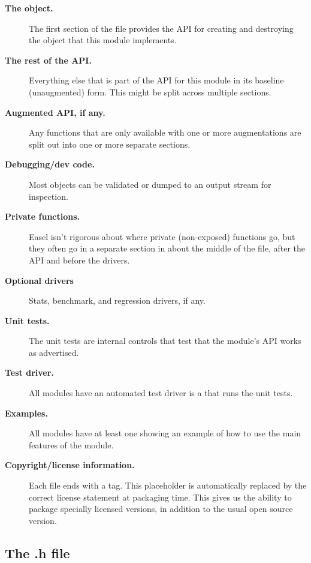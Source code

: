 \begin{description}
\item[\textbf{The  object.}]
  The first section of the file provides the API for creating and
  destroying the object that this module implements.

\item[\textbf{The rest of the API.}]
  Everything else that is part of the API for this module in its
  baseline (unaugmented) form. This might be split across multiple
  sections.

\item[\textbf{Augmented API, if any.}]
  Any functions that are only available with one or more augmentations
  are split out into one or more separate sections. 

\item[\textbf{Debugging/dev code.}]
  Most objects can be validated or dumped to an output stream
  for inspection.

\item[\textbf{Private functions.}]
  Easel isn't rigorous about where private (non-exposed) functions go,
  but they often go in a separate section in about the middle of the
   file, after the API and before the drivers.

\item[\textbf{Optional drivers}] Stats, benchmark, and regression
  drivers, if any. 

\item [\textbf{Unit tests.}]
  The unit tests are internal controls that test that the module's API
  works as advertised.

\item [\textbf{Test driver.}]
  All modules have an automated test driver is a  that
  runs the unit tests.
 
\item [\textbf{Examples.}]
  All modules have at least one  showing an example of
  how to use the main features of the module.

\item [\textbf{Copyright/license information.}]  Each file ends with a
   tag. This placeholder is automatically replaced by
  the correct license statement at packaging time. This gives us the
  ability to package specially licensed versions, in addition to the
  usual open source version.
\end{description}

\subsection{The .h file}


